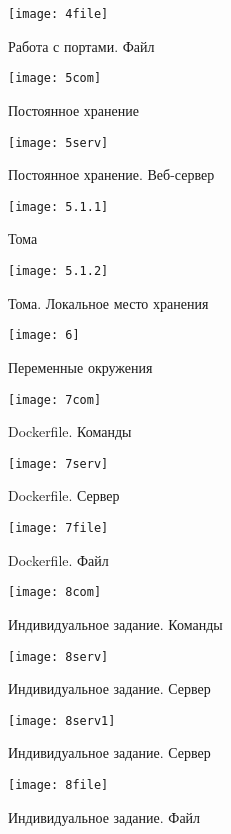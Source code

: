 \documentclass[a4paper,14pt]{extarticle}
\begin{document}
\begin{figure}[hptb]
	\centering
	\texttt{[image: 4file]}
	\caption{Работа с портами. Файл}
	\label{img:4file}
\end{figure}
\newpage
\begin{figure}[hptb]
	\centering
	\texttt{[image: 5com]}
	\caption{Постоянное хранение}
	\label{img:5com}
\end{figure}
\newpage
\begin{figure}[hptb]
	\centering
	\texttt{[image: 5serv]}
	\caption{Постоянное хранение. Веб-сервер}
	\label{img:5serv}
\end{figure}

\begin{figure}[hptb]
	\centering
	\texttt{[image: 5.1.1]}
	\caption{Тома}
	\label{img:5.1.1}
\end{figure}

\begin{figure}[hptb]
	\centering
	\texttt{[image: 5.1.2]}
	\caption{Тома. Локальное место хранения}
	\label{img:5.1.2}
\end{figure}

\begin{figure}[hptb]
	\centering
	\texttt{[image: 6]}
	\caption{Переменные окружения}
	\label{img:6}
\end{figure}

\begin{figure}[hptb]
	\centering
	\texttt{[image: 7com]}
	\caption{Dockerfile. Команды}
	\label{img:7com}
\end{figure}


\begin{figure}[hptb]
	\centering
	\texttt{[image: 7serv]}
	\caption{Dockerfile. Сервер}
	\label{img:7serv}
\end{figure}

\newpage
\begin{figure}[hptb]
	\centering
	\texttt{[image: 7file]}
	\caption{Dockerfile. Файл}
	\label{img:7file}
\end{figure}

\begin{figure}[hptb]
	\centering
	\texttt{[image: 8com]}
	\caption{Индивидуальное задание. Команды}
	\label{img:8com}
\end{figure}


\begin{figure}[hptb]
	\centering
	\texttt{[image: 8serv]}
	\caption{Индивидуальное задание. Сервер}
	\label{img:8serv}
\end{figure}
\newpage
\begin{figure}[hptb]
	\centering
	\texttt{[image: 8serv1]}
	\caption{Индивидуальное задание. Сервер}
	\label{img:8serv1}
\end{figure}

\newpage
\begin{figure}[hptb]
	\centering
	\texttt{[image: 8file]}
	\caption{Индивидуальное задание. Файл}
	\label{img:8file}
\end{figure}
\end{document}
